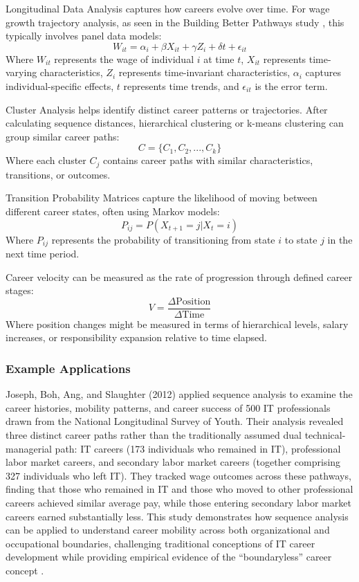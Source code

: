 \documentclass[../main.tex]{subfiles}
\begin{document}
Longitudinal Data Analysis captures how careers evolve over time. For wage growth trajectory analysis, as seen in the Building Better Pathways study \parencite{workforcegps2023}, this typically involves panel data models:
\[
W_{it} = \alpha_i + \beta X_{it} + \gamma Z_i + \delta t + \epsilon_{it}
\]
Where \(W_{it}\) represents the wage of individual \(i\) at time \(t\), \(X_{it}\) represents time-varying characteristics, \(Z_i\) represents time-invariant characteristics, \(\alpha_i\) captures individual-specific effects, \(t\) represents time trends, and \(\epsilon_{it}\) is the error term.

Cluster Analysis helps identify distinct career patterns or trajectories. After calculating sequence distances, hierarchical clustering or k-means clustering can group similar career paths:
\[
C = \{C_1, C_2, ..., C_k\}
\]
Where each cluster \(C_j\) contains career paths with similar characteristics, transitions, or outcomes.

Transition Probability Matrices capture the likelihood of moving between different career states, often using Markov models:
\[
P_{ij} = P(X_{t+1} = j | X_t = i)
\]
Where \(P_{ij}\) represents the probability of transitioning from state \(i\) to state \(j\) in the next time period.

Career velocity can be measured as the rate of progression through defined career stages:
\[
V = \frac{\Delta \text{Position}}{\Delta \text{Time}}
\]
Where position changes might be measured in terms of hierarchical levels, salary increases, or responsibility expansion relative to time elapsed.

\subsubsection{Example Applications}
Joseph, Boh, Ang, and Slaughter (2012) applied sequence analysis to examine the career histories, mobility patterns, and career success of 500 IT professionals drawn from the National Longitudinal Survey of Youth. Their analysis revealed three distinct career paths rather than the traditionally assumed dual technical-managerial path: IT careers (173 individuals who remained in IT), professional labor market careers, and secondary labor market careers (together comprising 327 individuals who left IT). They tracked wage outcomes across these pathways, finding that those who remained in IT and those who moved to other professional careers achieved similar average pay, while those entering secondary labor market careers earned substantially less. This study demonstrates how sequence analysis can be applied to understand career mobility across both organizational and occupational boundaries, challenging traditional conceptions of IT career development while providing empirical evidence of the ``boundaryless'' career concept \parencite{joseph2012}.
\end{document}
